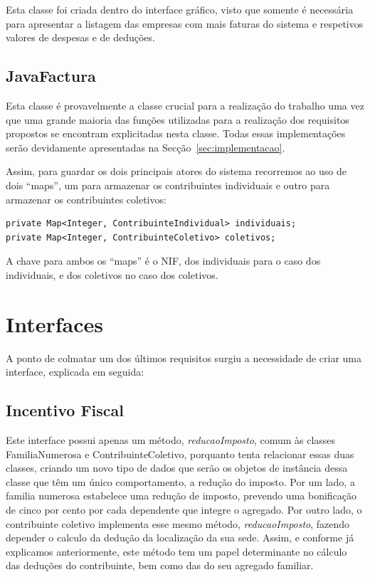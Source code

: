 \documentclass[a4paper]{article}
\begin{document}
Esta classe foi criada dentro do interface gráfico, visto que somente é necessária
para apresentar a listagem das empresas com mais faturas do sistema e respetivos
valores de despesas e de deduções.



\subsection{JavaFactura}
\label{sec:javafatura}

Esta classe é provavelmente a classe crucial para a realização do trabalho
uma vez que uma grande maioria das funções utilizadas para a realização dos
requisitos propostos se encontram explicitadas nesta classe. Todas essas
implementações serão devidamente apresentadas na Secção~\ref{sec:implementacao}.

Assim, para guardar os dois principais atores do sistema recorremos ao uso de
dois ``maps'', um para armazenar os contribuintes \textsf{individuais}
e outro para armazenar os contribuintes \textsf{coletivos}:

\begin{verbatim}
private Map<Integer, ContribuinteIndividual> individuais;
private Map<Integer, ContribuinteColetivo> coletivos;
\end{verbatim}

\vspace{0.2cm}

A chave para ambos os ``maps'' é o NIF, dos individuais para o caso dos individuais,
e dos coletivos no caso dos coletivos.



\section{Interfaces}
\label{sec:interfaces}

A ponto de colmatar um dos últimos requisitos surgiu a necessidade de criar uma
interface, explicada em seguida:



\subsection{Incentivo Fiscal}
\label{sec:incentivofiscal}

Este interface possui apenas um método, \emph{reducaoImposto}, comum às classes
FamiliaNumerosa e ContribuinteColetivo, porquanto tenta relacionar essas
duas classes, criando um novo tipo de dados que serão os objetos de instância dessa
classe que têm um único comportamento, a redução do imposto.
Por um lado, a familia numerosa estabelece uma redução de imposto,
prevendo uma bonificação de cinco por cento por cada dependente que integre o agregado.
Por outro lado, o contribuinte coletivo implementa esse mesmo método,
\emph{reducaoImposto}, fazendo depender o calculo da dedução da localização
da sua sede.
Assim, e conforme já explicamos anteriormente, este método tem um papel
determinante no cálculo das deduções do contribuinte, bem como das do seu agregado familiar.
\end{document}
